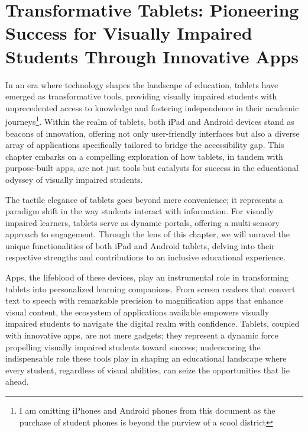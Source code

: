 \documentclass[14pt,letterpaper,twoside]{extreport}
\begin{document}
\cleardoublepage \hypertarget{ios-devices}{}\chapter[\raggedright Transformative Tablets: \\Pioneering Success for Visually Impaired Students Through Innovative Apps]{Transformative Tablets: Pioneering Success for Visually Impaired Students Through Innovative Apps}\label{ios-devices}
\minitoc \newpage
{}
In an era where technology shapes the landscape of education, tablets have emerged as transformative tools, providing visually impaired students with unprecedented access to knowledge and fostering independence in their academic journeys\footnote{I am omitting iPhones and Android phones from this document as the purchase of student phones is beyond the purview of a scool district}. Within the realm of tablets, both iPad and Android devices stand as beacons of innovation, offering not only user-friendly interfaces but also a diverse array of applications specifically tailored to bridge the accessibility gap. This chapter embarks on a compelling exploration of how tablets, in tandem with purpose-built apps, are not just tools but catalysts for success in the educational odyssey of visually impaired students.

The tactile elegance of tablets goes beyond mere convenience; it represents a paradigm shift in the way students interact with information. For visually impaired learners, tablets serve as dynamic portals, offering a multi-sensory approach to engagement. Through the lens of this chapter, we will unravel the unique functionalities of both iPad and Android tablets, delving into their respective strengths and contributions to an inclusive educational experience.

Apps, the lifeblood of these devices, play an instrumental role in transforming tablets into personalized learning companions. From screen readers that convert text to speech with remarkable precision to magnification apps that enhance visual content, the ecosystem of applications available empowers visually impaired students to navigate the digital realm with confidence. Tablets, coupled with innovative apps, are not mere gadgets; they represent a dynamic force propelling visually impaired students toward success; underscoring the indispensable role these tools play in shaping an educational landscape where every student, regardless of visual abilities, can seize the opportunities that lie ahead.
\end{document}
